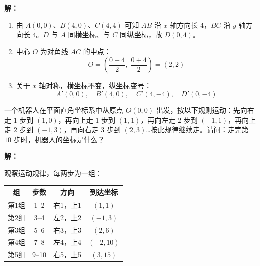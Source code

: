 \documentclass[12pt, a4paper]{ctexart}
\begin{document}
\textbf{解：}

\begin{enumerate}[label=(\arabic*)]
  \item 由 $A(0,0)$、$B(4,0)$、$C(4,4)$ 可知 $AB$ 沿 $x$ 轴方向长 $4$，$BC$ 沿 $y$ 轴方向长 $4$。$D$ 与 $A$ 同横坐标、与 $C$ 同纵坐标，故 $D(0, 4)$。

  \item 中心 $O$ 为对角线 $AC$ 的中点：
        $$O = \left(\dfrac{0+4}{2},\ \dfrac{0+4}{2}\right) = (2, 2)$$

  \item 关于 $x$ 轴对称，横坐标不变，纵坐标变号：
        $$A'(0, 0),\quad B'(4, 0),\quad C'(4, -4),\quad D'(0, -4)$$

        \begin{center}
        \end{center}
\end{enumerate}

\bigskip

\begin{appbox}[【应用3】机器人走格子]
一个机器人在平面直角坐标系中从原点 $O(0, 0)$ 出发，按以下规则运动：先向右走 $1$ 步到 $(1, 0)$，再向上走 $1$ 步到 $(1, 1)$，再向左走 $2$ 步到 $(-1, 1)$，再向上走 $2$ 步到 $(-1, 3)$，再向右走 $3$ 步到 $(2, 3)$\ldots 按此规律继续走。请问：走完第 $10$ 步时，机器人的坐标是什么？
\end{appbox}

\textbf{解：}

观察运动规律，每两步为一组：

\begin{center}
\renewcommand{\arraystretch}{1.3}
\begin{tabular}{|c|c|c|c|}
\hline
\textbf{组} & \textbf{步数} & \textbf{方向} & \textbf{到达坐标} \\
\hline
第1组 & 1--2 & 右1，上1 & $(1, 1)$ \\
\hline
第2组 & 3--4 & 左2，上2 & $(-1, 3)$ \\
\hline
第3组 & 5--6 & 右3，上3 & $(2, 6)$ \\
\hline
第4组 & 7--8 & 左4，上4 & $(-2, 10)$ \\
\hline
第5组 & 9--10 & 右5，上5 & $(3, 15)$ \\
\hline
\end{tabular}
\end{center}
\end{document}
